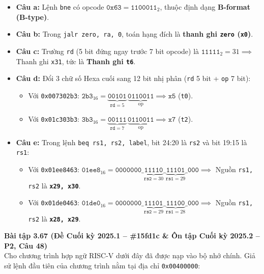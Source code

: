 \begin{itemize}
    \item \textbf{Câu a:} Lệnh \texttt{bne} có opcode $\texttt{0x63} = \texttt{1100011}_2$, thuộc định dạng \textbf{B-format (B-type)}.
    \item \textbf{Câu b:} Trong \texttt{jalr zero, ra, 0}, toán hạng đích là \textbf{thanh ghi \texttt{zero} (\texttt{x0})}.
    \item \textbf{Câu c:} Trường \texttt{rd} (5 bit đứng ngay trước 7 bit opcode) là $\texttt{11111}_2 = 31 \implies$ Thanh ghi \texttt{x31}, tức là \textbf{Thanh ghi \texttt{t6}}.
    \item \textbf{Câu d:} Đổi 3 chữ số Hexa cuối sang 12 bit nhị phân (\texttt{rd} 5 bit + \texttt{op} 7 bit):
    \begin{itemize}
        \item Với \texttt{0x007302b3}: $\texttt{2b3}_{16} = \underbrace{\texttt{00101}}_{\texttt{rd}=5}\,\underbrace{\texttt{0110011}}_{\text{op}} \implies \mathbf{\texttt{x5}}$ (\texttt{t0}).
        \item Với \texttt{0x01c303b3}: $\texttt{3b3}_{16} = \underbrace{\texttt{00111}}_{\texttt{rd}=7}\,\underbrace{\texttt{0110011}}_{\text{op}} \implies \mathbf{\texttt{x7}}$ (\texttt{t2}).
    \end{itemize}
    \item \textbf{Câu e:} Trong lệnh \texttt{beq rs1, rs2, label}, bit 24:20 là \texttt{rs2} và bit 19:15 là \texttt{rs1}:
    \begin{itemize}
        \item Với \texttt{0x01ee8463}: $\texttt{01ee8}_{16} = \texttt{0000000\_}\underbrace{\texttt{11110}}_{\texttt{rs2}=30}\_\underbrace{\texttt{11101}}_{\texttt{rs1}=29}\_\texttt{000} \implies$ Nguồn \texttt{rs1, rs2} là \textbf{\texttt{x29, x30}}.
        \item Với \texttt{0x01de0463}: $\texttt{01de0}_{16} = \texttt{0000000\_}\underbrace{\texttt{11101}}_{\texttt{rs2}=29}\_\underbrace{\texttt{11100}}_{\texttt{rs1}=28}\_\texttt{000} \implies$ Nguồn \texttt{rs1, rs2} là \textbf{\texttt{x28, x29}}.
    \end{itemize}
\end{itemize}

\textbf{Bài tập 3.67 (Đề Cuối kỳ 2025.1 -- \#15fd1c \& Ôn tập Cuối kỳ 2025.2 -- P2, Câu 48)}\\
Cho chương trình hợp ngữ RISC-V dưới đây đã được nạp vào bộ nhớ chính. Giả sử lệnh đầu tiên của chương trình nằm tại địa chỉ \texttt{0x00400000}:

